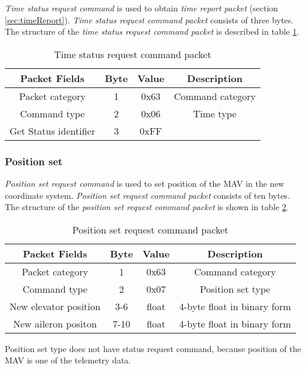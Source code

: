 \textit{Time status request command} is used to obtain \textit{time report packet} (section \ref{sec:timeReport}).
\textit{Time status request command packet} consists of three bytes. The structure of the \textit{time status request command packet} is described in table \ref{tab:timeStatusRequestCommandPacket}.
\begin{table}[H]
\begin{center}
\begin{tabular}{c c c c}
\toprule
\rowcolor[HTML]{FFFC9E} 
\textbf{Packet Fields} & \textbf{Byte} & \textbf{Value} & \textbf{Description}           \\ \midrule
Packet category        & 1             & 0x63           & Command category               \\ [1ex]
Command type           & 2             & 0x06           & Time type                      \\ [1ex]
Get Status identifier  & 3             & 0xFF           &     \\ [1ex] \bottomrule
\end{tabular}
\end{center}
\caption{Time status request command packet}
\label{tab:timeStatusRequestCommandPacket}
\end{table}

\subsubsection{Position set}
\label{sec:positionSetCommand}
\textit{Position set request command} is used to set position of the MAV in the new coordinate system. \textit{Position set request command packet} consists of ten bytes. The structure of the \textit{position set request command packet} is shown in table \ref{tab:positionSetRequestCommandPacket}.
\begin{table}[H]
\begin{center}
\begin{tabular}{c c c c}
\toprule
\rowcolor[HTML]{FFFC9E} 
\textbf{Packet Fields} & \textbf{Byte} & \textbf{Value} & \textbf{Description}        \\ \midrule
Packet category        & 1             & 0x63           & Command category            \\[1ex]
Command type           & 2             & 0x07           & Position set type           \\[1ex]
New elevator position  & 3-6           & float          & 4-byte float in binary form \\[1ex]
New aileron positon    & 7-10          & float          & 4-byte float in binary form \\ [1ex] \bottomrule
\end{tabular}
\end{center}
\caption{Position set request command packet}
\label{tab:positionSetRequestCommandPacket}
\end{table}
Position set type does not have status request command, because position of the MAV is one of the telemetry data.


